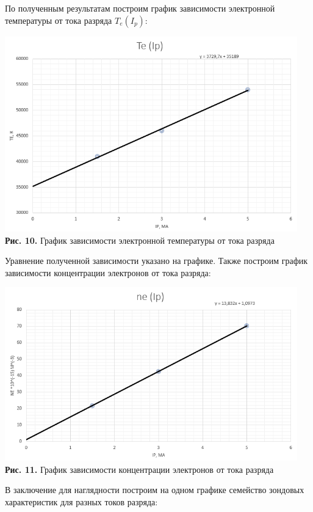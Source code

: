 \documentclass[a4paper,12pt]{article} %
\begin{document}
\hfill \break По полученным результатам построим график зависимости электронной температуры от тока разряда $T_{e} (I_{p})$:

\begin{center}
\includegraphics[width=0.95\textwidth]{3.5.1_12.png}\\
\textbf{Рис. 10.} График зависимости электронной температуры от тока разряда \\
\end{center}

\hfill \break Уравнение полученной зависимости указано на графике. Также построим график зависимости концентрации электронов от тока разряда:

\begin{center}
\includegraphics[width=0.95\textwidth]{3.5.1_13.png}\\
\textbf{Рис. 11.} График зависимости концентрации электронов от тока разряда \\
\end{center}

\hfill \break В заключение для наглядности построим на одном графике семейство зондовых характеристик для разных токов разряда:
\end{document}
